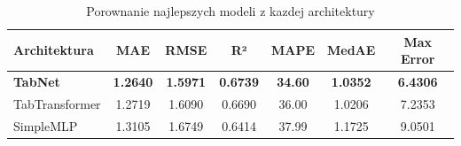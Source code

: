 \begin{table}[h]
\centering
\caption{Porownanie najlepszych modeli z kazdej architektury}
\label{tab:architecture_comparison}
\begin{tabular}{lcccccc}
\toprule
Architektura & MAE & RMSE & R² & MAPE & MedAE & Max Error \\
\midrule
\textbf{TabNet} & \textbf{1.2640} & \textbf{1.5971} & \textbf{0.6739} & \textbf{34.60} & \textbf{1.0352} & \textbf{6.4306} \\
TabTransformer & 1.2719 & 1.6090 & 0.6690 & 36.00 & 1.0206 & 7.2353 \\
SimpleMLP & 1.3105 & 1.6749 & 0.6414 & 37.99 & 1.1725 & 9.0501 \\
\bottomrule
\end{tabular}
\end{table}
